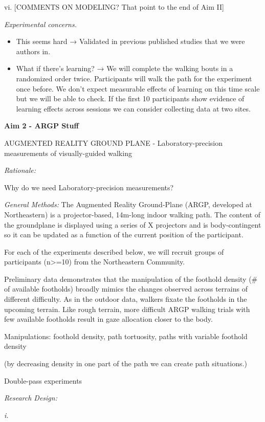 \documentclass[
]{article}
\begin{document}
vi. {[}COMMENTS ON MODELING? That point to the end of Aim II{]}

\emph{Experimental concerns.}

\begin{itemize}
\item
  This seems hard → Validated in previous published studies that we were
  authors in.
\item
  What if there's learning? → We will complete the walking bouts in a
  randomized order twice. Participants will walk the path for the
  experiment once before. We don't expect measurable effects of learning
  on this time scale but we will be able to check. If the first 10
  participants show evidence of learning effects across sessions we can
  consider collecting data at two sites.
\end{itemize}

\textbf{Aim 2 - ARGP Stuff}

AUGMENTED REALITY GROUND PLANE - Laboratory-precision measurements of
visually-guided walking

\emph{Rationale:}

Why do we need Laboratory-precision measurements?

\emph{General Methods:} The Augmented Reality Ground-Plane (ARGP,
developed at Northeastern) is a projector-based, 14m-long indoor walking
path. The content of the groundplane is displayed using a series of X
projectors and is body-contingent so it can be updated as a function of
the current position of the participant.

For each of the experiments described below, we will recruit groups of
participants (n\textgreater=10) from the Northeastern Community.

Preliminary data demonstrates that the manipulation of the foothold
density (\# of available footholds) broadly mimics the changes observed
across terrains of different difficulty. As in the outdoor data, walkers
fixate the footholds in the upcoming terrain. Like rough terrain, more
difficult ARGP walking trials with few available footholds result in
gaze allocation closer to the body.

Manipulations: foothold density, path tortuosity, paths with variable
foothold density

(by decreasing density in one part of the path we can create path
situations.)

Double-pass experiments

\emph{Research Design:}

\emph{i.}
\end{document}
